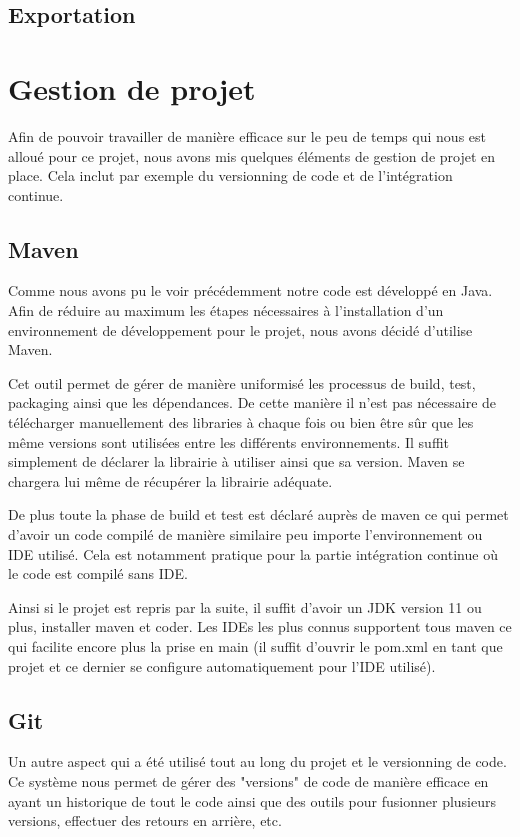\documentclass[final, noposter]{polytech/polytech}
\begin{document}
	\section{Exportation}

\chapter{Gestion de projet}
	Afin de pouvoir travailler de manière efficace sur le peu de temps qui nous est alloué pour ce projet, nous avons mis quelques éléments de gestion de projet en place.
	Cela inclut par exemple du versionning de code et de l'intégration continue.
	
	\section{Maven\label{sec:maven}}
		Comme nous avons pu le voir précédemment notre code est développé en Java.
		Afin de réduire au maximum les étapes nécessaires à l'installation d'un environnement de développement pour le projet, nous avons décidé d'utilise Maven.
		
		Cet outil permet de gérer de manière uniformisé les processus de build, test, packaging ainsi que les dépendances.
		De cette manière il n'est pas nécessaire de télécharger manuellement des libraries à chaque fois ou bien être sûr que les même versions sont utilisées entre les différents environnements.
		Il suffit simplement de déclarer la librairie à utiliser ainsi que sa version.
		Maven se chargera lui même de récupérer la librairie adéquate.
		
		De plus toute la phase de build et test est déclaré auprès de maven ce qui permet d'avoir un code compilé de manière similaire peu importe l'environnement ou IDE utilisé.
		Cela est notamment pratique pour la partie intégration continue où le code est compilé sans IDE.
		
		Ainsi si le projet est repris par la suite, il suffit d'avoir un JDK version 11 ou plus, installer maven et coder.
		Les IDEs les plus connus supportent tous maven ce qui facilite encore plus la prise en main (il suffit d'ouvrir le pom.xml en tant que projet et ce dernier se configure automatiquement pour l'IDE utilisé).
	
		
	\section{Git}
		Un autre aspect qui a été utilisé tout au long du projet et le versionning de code.
		Ce système nous permet de gérer des "versions" de code de manière efficace en ayant un historique de tout le code ainsi que des outils pour fusionner plusieurs versions, effectuer des retours en arrière, etc.
		
\end{document}
